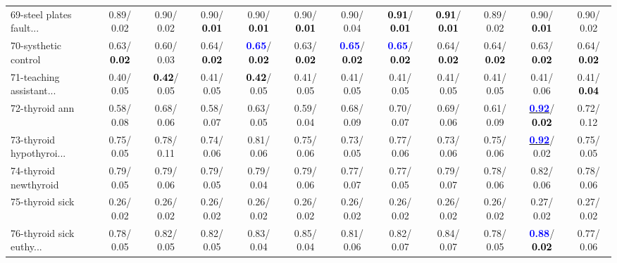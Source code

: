 \begin{table}[h]
\begin{center}
{\begin{tabular}{lc|c|c|c|c|c|c|c|c|c|c}
69-steel plates fault... &   0.89/  0.02 &   0.90/  0.02 &   0.90/\textcolor{black}{\textbf{  0.01}} &   0.90/\textcolor{black}{\textbf{  0.01}} &   0.90/\textcolor{black}{\textbf{  0.01}} &   0.90/  0.04 & \textcolor{black}{\textbf{  0.91}}/\textcolor{black}{\textbf{  0.01}} & \textcolor{black}{\textbf{  0.91}}/\textcolor{black}{\textbf{  0.01}} &   0.89/  0.02 &   0.90/\textcolor{black}{\textbf{  0.01}} &   0.90/  0.02 \\
70-systhetic control &   0.63/\textcolor{black}{\textbf{  0.02}} &   0.60/  0.03 &   0.64/\textcolor{black}{\textbf{  0.02}} & \textcolor{blue}{\textbf{  0.65}}/\textcolor{black}{\textbf{  0.02}} &   0.63/\textcolor{black}{\textbf{  0.02}} & \textcolor{blue}{\textbf{  0.65}}/\textcolor{black}{\textbf{  0.02}} & \textcolor{blue}{\textbf{  0.65}}/\textcolor{black}{\textbf{  0.02}} &   0.64/\textcolor{black}{\textbf{  0.02}} &   0.64/\textcolor{black}{\textbf{  0.02}} &   0.63/\textcolor{black}{\textbf{  0.02}} &   0.64/\textcolor{black}{\textbf{  0.02}} \\
71-teaching assistant... &   0.40/  0.05 & \textcolor{black}{\textbf{  0.42}}/  0.05 &   0.41/  0.05 & \textcolor{black}{\textbf{  0.42}}/  0.05 &   0.41/  0.05 &   0.41/  0.05 &   0.41/  0.05 &   0.41/  0.05 &   0.41/  0.05 &   0.41/  0.06 &   0.41/\textcolor{black}{\textbf{  0.04}} \\ \hline
72-thyroid ann &   0.58/  0.08 &   0.68/  0.06 &   0.58/  0.07 &   0.63/  0.05 &   0.59/  0.04 &   0.68/  0.09 &   0.70/  0.07 &   0.69/  0.06 &   0.61/  0.09 & \underline{\textcolor{blue}{\textbf{  0.92}}}/\textcolor{black}{\textbf{  0.02}} &   0.72/  0.12 \\
73-thyroid hypothyroi... &   0.75/  0.05 &   0.78/  0.11 &   0.74/  0.06 &   0.81/  0.06 &   0.75/  0.06 &   0.73/  0.05 &   0.77/  0.06 &   0.73/  0.06 &   0.75/  0.06 & \underline{\textcolor{blue}{\textbf{  0.92}}}/  0.02 &   0.75/  0.05 \\
74-thyroid newthyroid &   0.79/  0.05 &   0.79/  0.06 &   0.79/  0.05 &   0.79/  0.04 &   0.79/  0.06 &   0.77/  0.07 &   0.77/  0.05 &   0.79/  0.07 &   0.78/  0.06 &   0.82/  0.06 &   0.78/  0.06 \\
75-thyroid sick &   0.26/  0.02 &   0.26/  0.02 &   0.26/  0.02 &   0.26/  0.02 &   0.26/  0.02 &   0.26/  0.02 &   0.26/  0.02 &   0.26/  0.02 &   0.26/  0.02 &   0.27/  0.02 &   0.27/  0.02 \\
76-thyroid sick euthy... &   0.78/  0.05 &   0.82/  0.05 &   0.82/  0.05 &   0.83/  0.04 &   0.85/  0.04 &   0.81/  0.06 &   0.82/  0.07 &   0.84/  0.07 &   0.78/  0.05 & \textcolor{blue}{\textbf{  0.88}}/\textcolor{black}{\textbf{  0.02}} &   0.77/  0.06 \\

\end{tabular}}
\end{center}
\end{table}
